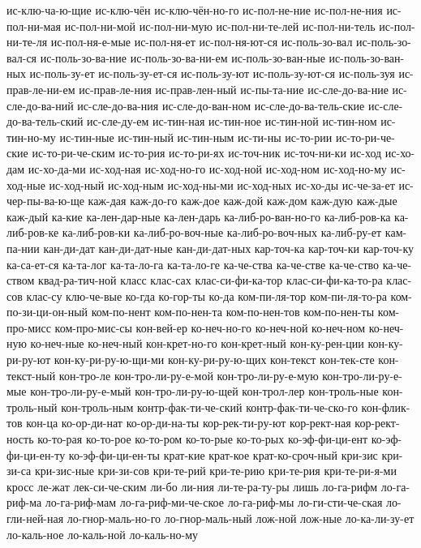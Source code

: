 {ис-клю-ча-ю-щие
ис-клю-чён
ис-клю-чён-но-го
ис-пол-не-ние
ис-пол-не-ния
ис-пол-ни-мая
ис-пол-ни-мой
ис-пол-ни-мую
ис-пол-ни-те-лей
ис-пол-ни-тель
ис-пол-ни-те-ля
ис-пол-ня-е-мые
ис-пол-ня-ет
ис-пол-ня-ют-ся
ис-поль-зо-вал
ис-поль-зо-вал-ся
ис-поль-зо-ва-ние
ис-поль-зо-ва-ни-ем
ис-поль-зо-ван-ные
ис-поль-зо-ван-ных
ис-поль-зу-ет
ис-поль-зу-ет-ся
ис-поль-зу-ют
ис-поль-зу-ют-ся
ис-поль-зуя
ис-прав-ле-ни-ем
ис-прав-ле-ния
ис-прав-лен-ный
ис-пы-та-ние
ис-сле-до-ва-ние
ис-сле-до-ва-ний
ис-сле-до-ва-ния
ис-сле-до-ван-ном
ис-сле-до-ва-тель-ские
ис-сле-до-ва-тель-ский
ис-сле-ду-ем
ис-тин-ная
ис-тин-ное
ис-тин-ной
ис-тин-ном
ис-тин-но-му
ис-тин-ные
ис-тин-ный
ис-тин-ным
ис-ти-ны
ис-то-рии
ис-то-ри-че-ские
ис-то-ри-че-ским
ис-то-рия
ис-то-ри-ях
ис-точ-ник
ис-точ-ни-ки
ис-ход
ис-хо-дам
ис-хо-да-ми
ис-ход-ная
ис-ход-но-го
ис-ход-ной
ис-ход-ном
ис-ход-но-му
ис-ход-ные
ис-ход-ный
ис-ход-ным
ис-ход-ны-ми
ис-ход-ных
ис-хо-ды
ис-че-за-ет
ис-чер-пы-ва-ю-ще
каж-дая
каж-до-го
каж-дое
каж-дой
каж-дом
каж-дую
каж-дые
каж-дый
ка-кие
ка-лен-дар-ные
ка-лен-дарь
ка-либ-ро-ван-но-го
ка-либ-ров-ка
ка-либ-ров-ке
ка-либ-ров-ки
ка-либ-ро-воч-ные
ка-либ-ро-воч-ных
ка-либ-ру-ет
кам-па-нии
кан-ди-дат
кан-ди-дат-ные
кан-ди-дат-ных
кар-точ-ка
кар-точ-ки
кар-точ-ку
ка-са-ет-ся
ка-та-лог
ка-та-ло-га
ка-та-ло-ге
ка-че-ства
ка-че-стве
ка-че-ство
ка-че-ством
квад-ра-тич-ной
класс
клас-сах
клас-си-фи-ка-тор
клас-си-фи-ка-то-ра
клас-сов
клас-су
клю-че-вые
ко-гда
ко-гор-ты
ко-да
ком-пи-ля-тор
ком-пи-ля-то-ра
ком-по-зи-ци-он-ный
ком-по-нент
ком-по-нен-та
ком-по-нен-тов
ком-по-нен-ты
ком-про-мисс
ком-про-мис-сы
кон-вей-ер
ко-неч-но-го
ко-неч-ной
ко-неч-ном
ко-неч-ную
ко-неч-ные
ко-неч-ный
кон-крет-но-го
кон-крет-ный
кон-ку-рен-ции
кон-ку-ри-ру-ют
кон-ку-ри-ру-ю-щи-ми
кон-ку-ри-ру-ю-щих
кон-текст
кон-тек-сте
кон-текст-ный
кон-тро-ле
кон-тро-ли-ру-е-мой
кон-тро-ли-ру-е-мую
кон-тро-ли-ру-е-мые
кон-тро-ли-ру-е-мый
кон-тро-ли-ру-ю-щей
кон-трол-лер
кон-троль-ные
кон-троль-ный
кон-троль-ным
контр-фак-ти-че-ский
контр-фак-ти-че-ско-го
кон-флик-тов
кон-ца
ко-ор-ди-нат
ко-ор-ди-на-ты
кор-рек-ти-ру-ют
кор-рект-ная
кор-рект-ность
ко-то-рая
ко-то-рое
ко-то-ром
ко-то-рые
ко-то-рых
ко-эф-фи-ци-ент
ко-эф-фи-ци-ен-ту
ко-эф-фи-ци-ен-ты
крат-кие
крат-кое
крат-ко-сроч-ный
кри-зис
кри-зи-са
кри-зис-ные
кри-зи-сов
кри-те-рий
кри-те-рию
кри-те-рия
кри-те-ри-я-ми
кросс
ле-жат
лек-си-че-ским
ли-бо
ли-ния
ли-те-ра-ту-ры
лишь
ло-га-рифм
ло-га-риф-ма
ло-га-риф-мам
ло-га-риф-ми-че-ское
ло-га-риф-мы
ло-ги-сти-че-ская
ло-гли-ней-ная
ло-гнор-маль-но-го
ло-гнор-маль-ный
лож-ной
лож-ные
ло-ка-ли-зу-ет
ло-каль-ное
ло-каль-ной
ло-каль-но-му
}
